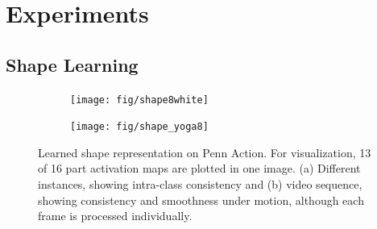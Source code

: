 \chapter{Experiments}

\section{Shape Learning}
	\begin{figure}[htp]
		\begin{subfigure}{1.\textwidth}
		\centering
		\texttt{[image: fig/shape8white]}\caption{}
		\label{fig:shape_penn}
		\end{subfigure}
		\begin{subfigure}{1.\textwidth}
		\centering
		\texttt{[image: fig/shape\_yoga8]}\caption{}
		\label{fig:shape_tennis}
		\end{subfigure}
		\caption{Learned shape representation on Penn Action. For visualization, 13 of 16 part activation maps are plotted in one image. (a) Different instances, showing intra-class consistency and (b) video sequence, showing consistency and smoothness under motion, although each frame is processed individually.}
		\label{fig:shape}
	\end{figure}

